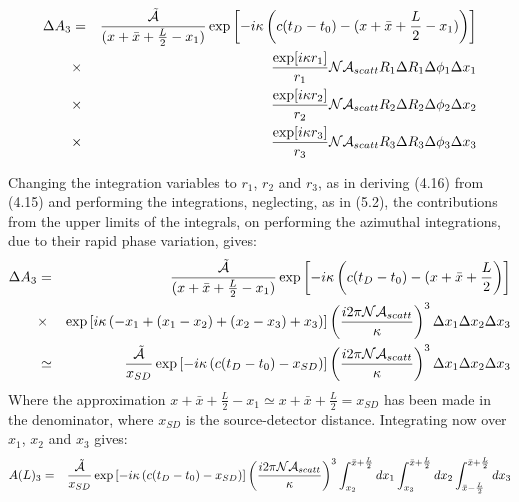 {  \begin{eqnarray}
     \Delta A_3 & = & \frac{\tilde{{\cal A}}}{(x +\bar{x} +\frac{L}{2}-x_1)}
   \exp\left[ - i \kappa\left(c(t_D-t_0)-(x + \bar{x} +\frac{L}{2}-x_1)\right)\right]
      \nonumber \\
      &\times & \frac{\exp[i \kappa r_1]}{r_1} {\cal N}{\cal A}_{scatt} R_1 \Delta R_1 \Delta \phi_1 \Delta x_1
      \nonumber \\
       &\times  & \frac{\exp[i \kappa r_2]}{r_2} {\cal N}{\cal A}_{scatt} R_2 \Delta R_2 \Delta \phi_2 \Delta x_2
     \nonumber \\
      & \times & \frac{\exp[i \kappa r_3]}{r_3} {\cal N}{\cal A}_{scatt}  R_3 \Delta R_3  \Delta \phi_3 \Delta x_3
 \end{eqnarray} 
    
     Changing the integration variables to $r_1$, $r_2$ and $r_3$, as in
     deriving (4.16) from (4.15)  and performing the integrations,
     neglecting, as in (5.2), the contributions from the upper limits of the integrals, on 
      performing the azimuthal integrations,
     due to their rapid phase variation, gives:
   \begin{eqnarray}
     \Delta A_3 & = & \frac{\tilde{{\cal A}}}{(x +\bar{x} +\frac{L}{2}-x_1)}
   \exp\left[ - i \kappa\left(c(t_D-t_0)-(x +\bar{x} +\frac{L}{2}\right)\right]
      \nonumber \\
      &\times & \exp \left [i \kappa \left( -x_1 + (x_1-x_2) + (x_2-x_3) +x_3 \right)\right]
      \left(\frac{i 2 \pi {\cal N}{\cal A}_{scatt}}{\kappa}\right)^3 \Delta x_1 \Delta x_2 \Delta x_3
      \nonumber \\
       & \simeq  &\frac{\tilde{{\cal A}}}{x_{SD}}
   \exp\left[ - i \kappa\left(c(t_D-t_0)-x_{SD}\right)\right]
      \left(\frac{i 2 \pi {\cal N}{\cal A}_{scatt}}{\kappa}\right)^3 \Delta x_1 \Delta x_2 \Delta x_3    
 \end{eqnarray} 
    Where the approximation $x +\bar{x} +\frac{L}{2}-x_1 \simeq x +\bar{x} +\frac{L}{2} = x_{SD}$
  has been made in the denominator, where $x_{SD}$ is the source-detector distance. Integrating now over $x_1$, $x_2$ 
  and $x_3$ gives:
     \begin{eqnarray}
      A(L)_3 & = & \frac{\tilde{{\cal A}}}{x_{SD}}
   \exp\left[ - i \kappa\left(c(t_D-t_0)-x_{SD}\right)\right]
      \left(\frac{i 2 \pi {\cal N}{\cal A}_{scatt}}{\kappa}\right)^3
      \int_{x_2}^{\bar{x} +\frac{L}{2}} d x_1  \int_{x_3}^{\bar{x} +\frac{L}{2}} d x_2
   \int_{\bar{x} -\frac{L}{2}}^{\bar{x} +\frac{L}{2}} dx_3
   \nonumber \\

\end{eqnarray}}

